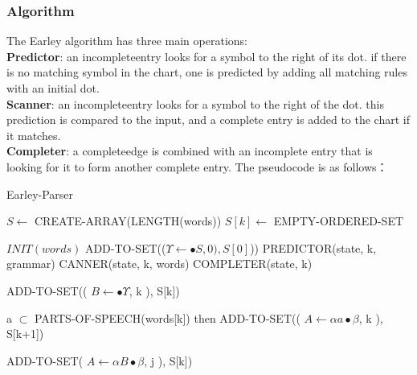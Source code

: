 \documentclass{article}
\begin{document}
\subsubsection{Algorithm}
The Earley algorithm has three main operations:\\
\textbf{Predictor}: an incompleteentry looks for a symbol to the right
of its dot. if there is no matching symbol in the chart, one is
predicted by adding all matching rules with an initial dot.\\
\textbf{Scanner}: an incompleteentry looks for a symbol to the right of the dot. this prediction is compared to the input, and a
complete entry is added to the chart if it matches.\\
\textbf{Completer}: a completeedge is combined with an incomplete
entry that is looking for it to form another complete entry. The pseudocode is as follows：
\begin{algorithm}  
        \caption{Earley-Parser}  
        \begin{algorithmic}
                \State $S \gets$ CREATE-ARRAY(LENGTH(words))  
 	      \For{$k \gets$ from $0$ to length(words)]}  
      		\State $S[k] \gets$ EMPTY-ORDERED-SET
    	      \EndFor  	
            \EndFunction  

                \State $ INIT(words) $
                \State ADD-TO-SET(($\Upsilon \gets \bullet S, 0 ), S[0]$))  
                 \For{$k \gets$ from $0$ to length(words)]}  
		   \For{$k \gets$ from $0$ to length(words)]}  
					\State  PREDICTOR(state, k, grammar)
				\Else  
					\State  CANNER(state, k, words)
				\EndIf 
			 \Else  
			 	\State COMPLETER(state, k)
			\EndIf 
		    \EndFor 
	       \EndFor
	\State {}   	
	\EndFunction  
	
		\State ADD-TO-SET(( $B \gets \bullet \Upsilon$, k ),  S[k]) 
	\EndFor
	\EndFunction  

	 \If a $\subset$ PARTS-OF-SPEECH(words[k]) then
		\State ADD-TO-SET(( $A \gets \alpha a\bullet \beta$, k ),  S[k+1]) 
	\EndIf
	\EndFunction  

		\State ADD-TO-SET( $A \gets \alpha B \bullet \beta$, j ),  S[k]) 
	\EndFor
	\EndFunction  

        \end{algorithmic}  
    \end{algorithm}  
\end{document}
